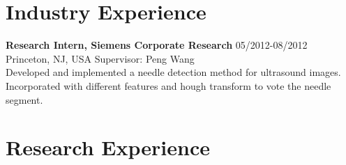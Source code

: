 \documentclass[line,margin]{res}
\begin{document}
\begin{resume}
\section{\sc Industry Experience} 
\smallskip

\textbf{Research Intern, Siemens Corporate Research} \hfill      05/2012-08/2012 \\
Princeton, NJ, USA  \hfill {Supervisor: Peng Wang}\\
Developed and implemented a needle detection method for ultrasound images. Incorporated with different features and hough transform to vote the needle segment.\vspace{.05in} %

\section{\sc Research Experience} 
\smallskip


\end{resume}
\end{document}
